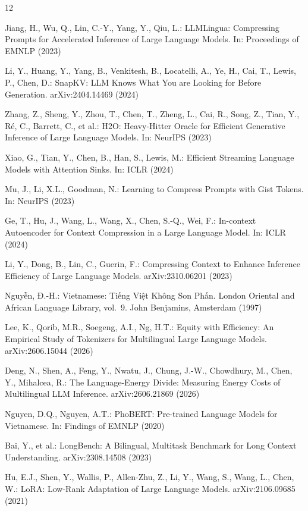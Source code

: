 \documentclass[runningheads]{llncs}
\begin{document}
\begin{thebibliography}{12}

Jiang, H., Wu, Q., Lin, C.-Y., Yang, Y., Qiu, L.: LLMLingua: Compressing Prompts for Accelerated Inference of Large Language Models. In: Proceedings of EMNLP (2023)

Li, Y., Huang, Y., Yang, B., Venkitesh, B., Locatelli, A., Ye, H., Cai, T., Lewis, P., Chen, D.: SnapKV: LLM Knows What You are Looking for Before Generation. arXiv:2404.14469 (2024)

Zhang, Z., Sheng, Y., Zhou, T., Chen, T., Zheng, L., Cai, R., Song, Z., Tian, Y., Ré, C., Barrett, C., et al.: H2O: Heavy-Hitter Oracle for Efficient Generative Inference of Large Language Models. In: NeurIPS (2023)

Xiao, G., Tian, Y., Chen, B., Han, S., Lewis, M.: Efficient Streaming Language Models with Attention Sinks. In: ICLR (2024)

Mu, J., Li, X.L., Goodman, N.: Learning to Compress Prompts with Gist Tokens. In: NeurIPS (2023)

Ge, T., Hu, J., Wang, L., Wang, X., Chen, S.-Q., Wei, F.: In-context Autoencoder for Context Compression in a Large Language Model. In: ICLR (2024)

Li, Y., Dong, B., Lin, C., Guerin, F.: Compressing Context to Enhance Inference Efficiency of Large Language Models. arXiv:2310.06201 (2023)

Nguyễn, Đ.-H.: Vietnamese: Tiếng Việt Không Son Phấn. London Oriental and African Language Library, vol.~9. John Benjamins, Amsterdam (1997)

Lee, K., Qorib, M.R., Soegeng, A.I., Ng, H.T.: Equity with Efficiency: An Empirical Study of Tokenizers for Multilingual Large Language Models. arXiv:2606.15044 (2026)

Deng, N., Shen, A., Feng, Y., Nwatu, J., Chung, J.-W., Chowdhury, M., Chen, Y., Mihalcea, R.: The Language-Energy Divide: Measuring Energy Costs of Multilingual LLM Inference. arXiv:2606.21869 (2026)

Nguyen, D.Q., Nguyen, A.T.: PhoBERT: Pre-trained Language Models for Vietnamese. In: Findings of EMNLP (2020)

Bai, Y., et al.: LongBench: A Bilingual, Multitask Benchmark for Long Context Understanding. arXiv:2308.14508 (2023)

Hu, E.J., Shen, Y., Wallis, P., Allen-Zhu, Z., Li, Y., Wang, S., Wang, L., Chen, W.: LoRA: Low-Rank Adaptation of Large Language Models. arXiv:2106.09685 (2021)

\end{thebibliography}
\end{document}

